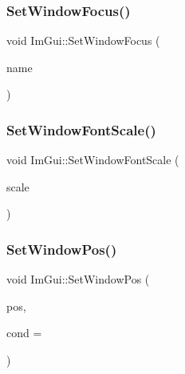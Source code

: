 \hypertarget{namespace_im_gui_aa612adbb975051090898f094a1608f24}{}\label{namespace_im_gui_aa612adbb975051090898f094a1608f24} 
\subsubsection{\texorpdfstring{Set\+Window\+Focus()}{SetWindowFocus()}\hspace{0.1cm}{\footnotesize\ttfamily [2/2]}}
{\footnotesize\ttfamily void Im\+Gui\+::\+Set\+Window\+Focus (\begin{DoxyParamCaption}\item[{const char $\ast$}]{name }\end{DoxyParamCaption})}

\hypertarget{namespace_im_gui_a11f2f343dbc9b00ccd9e99ebd59cfe8b}{}\label{namespace_im_gui_a11f2f343dbc9b00ccd9e99ebd59cfe8b} 
\subsubsection{\texorpdfstring{Set\+Window\+Font\+Scale()}{SetWindowFontScale()}}
{\footnotesize\ttfamily void Im\+Gui\+::\+Set\+Window\+Font\+Scale (\begin{DoxyParamCaption}\item[{float}]{scale }\end{DoxyParamCaption})}

\hypertarget{namespace_im_gui_aaa81e004de4c0a5cedb836e92e8aa0e5}{}\label{namespace_im_gui_aaa81e004de4c0a5cedb836e92e8aa0e5} 
\subsubsection{\texorpdfstring{Set\+Window\+Pos()}{SetWindowPos()}\hspace{0.1cm}{\footnotesize\ttfamily [1/2]}}
{\footnotesize\ttfamily void Im\+Gui\+::\+Set\+Window\+Pos (\begin{DoxyParamCaption}\item[{const \hyperlink{struct_im_vec2}{Im\+Vec2} \&}]{pos,  }\item[{Im\+Gui\+Cond}]{cond = {} }\end{DoxyParamCaption})}

